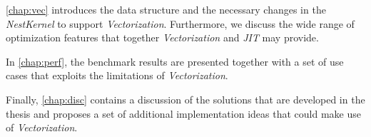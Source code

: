 \autoref{chap:vec} introduces the data structure and the necessary changes in the \emph{NestKernel} to support \emph{Vectorization}. Furthermore, we discuss the wide range of optimization features that together \emph{Vectorization} and \emph{JIT} may provide.

In \autoref{chap:perf}, the benchmark results are presented together with a set of use cases that exploits the limitations of \emph{Vectorization}.

Finally, \autoref{chap:disc} contains a discussion of the solutions that are developed in the thesis and proposes a set of additional implementation ideas that could make use of \emph{Vectorization}.



\cleardoublepage
